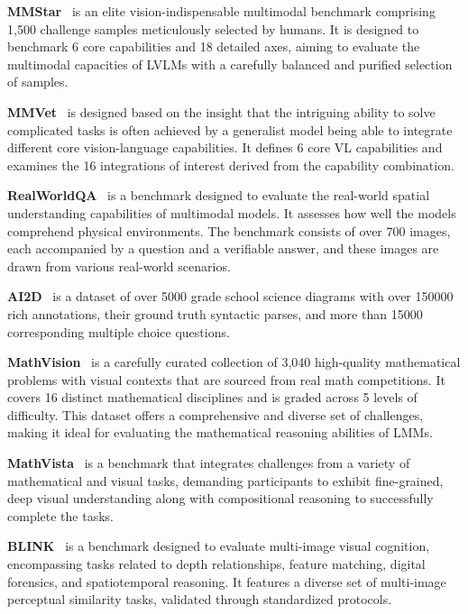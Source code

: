 \documentclass{article}
\newcommand{\citep}[1]{\parencite{#1}}
\begin{document}
\textbf{MMStar}~\citep{chen2024mmstar} is an elite vision-indispensable multimodal benchmark comprising 1,500 challenge samples meticulously selected by humans. It is designed to benchmark 6 core capabilities and 18 detailed axes, aiming to evaluate the multimodal capacities of LVLMs with a carefully balanced and purified selection of samples.

\textbf{MMVet}~\citep{yu2024mmvet} is designed based on the insight that the intriguing ability to solve complicated tasks is often achieved by a generalist model being able to integrate different core vision-language  capabilities. It defines 6 core VL capabilities and examines the 16 integrations of interest derived from the capability combination. 

 
\textbf{RealWorldQA}~\citep{realworldQA} is a benchmark designed to evaluate the real-world spatial understanding capabilities of multimodal  models. It assesses how well the models comprehend physical environments. The benchmark consists of over 700 images, each accompanied by a question and a verifiable answer, and these images are drawn from various real-world scenarios.

\textbf{AI2D}~\citep{kembhavi2016ai2d} is a dataset of over 5000 grade school science diagrams with over 150000 rich annotations, their ground truth syntactic parses, and more than 15000 corresponding multiple choice questions.

\textbf{MathVision}~\citep{wang2024measuring} is a carefully curated collection of 3,040 high-quality mathematical problems with visual contexts that are sourced from real math competitions. It covers 16 distinct mathematical disciplines and is graded across 5 levels of difficulty. This dataset offers a comprehensive and diverse set of challenges, making it ideal for evaluating the mathematical reasoning abilities of LMMs.

\textbf{MathVista}~\citep{lu2023mathvista} is a benchmark that integrates challenges from a variety of mathematical and visual tasks, demanding participants to exhibit fine-grained, deep visual understanding along with compositional reasoning to successfully complete the tasks.

\textbf{BLINK}~\citep{fu2024blink} is a benchmark designed to evaluate multi-image visual cognition, encompassing tasks related to depth relationships, feature matching, digital forensics, and spatiotemporal reasoning. It features a diverse set of multi-image perceptual similarity tasks, validated through standardized protocols.
\end{document}

